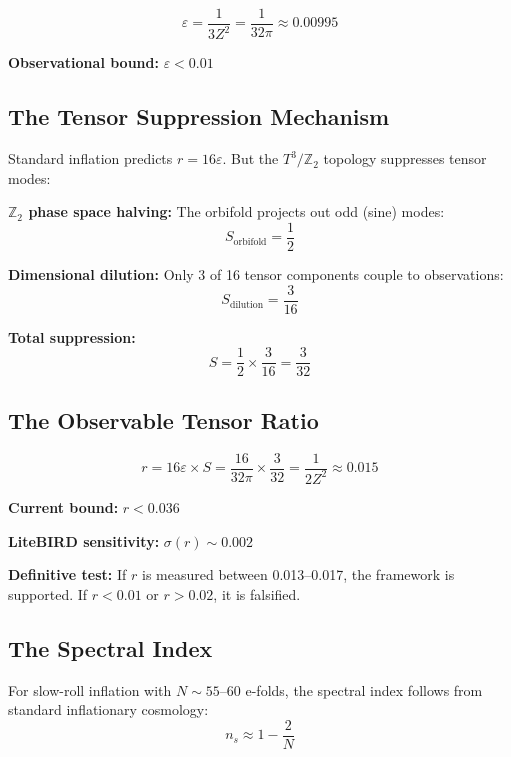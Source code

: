 \documentclass[12pt,a4paper]{article}
\newcommand{\Ztwo}{\mathbb{Z}_2}
\newcommand{\Tthree}{T^3}
\newcommand{\Zsq}{Z^2}
\begin{document}
\begin{equation}
\varepsilon = \frac{1}{3\Zsq} = \frac{1}{32\pi} \approx 0.00995
\end{equation}

\textbf{Observational bound:} $\varepsilon < 0.01$ \checkmark

\subsection{The Tensor Suppression Mechanism}

Standard inflation predicts $r = 16\varepsilon$. But the $\Tthree/\Ztwo$ topology suppresses tensor modes:

\textbf{$\Ztwo$ phase space halving:} The orbifold projects out odd (sine) modes:
\begin{equation}
S_{\text{orbifold}} = \frac{1}{2}
\end{equation}

\textbf{Dimensional dilution:} Only 3 of 16 tensor components couple to observations:
\begin{equation}
S_{\text{dilution}} = \frac{3}{16}
\end{equation}

\textbf{Total suppression:}
\begin{equation}
S = \frac{1}{2} \times \frac{3}{16} = \frac{3}{32}
\end{equation}

\subsection{The Observable Tensor Ratio}

\begin{equation}
\boxed{r = 16\varepsilon \times S = \frac{16}{32\pi} \times \frac{3}{32} = \frac{1}{2\Zsq} \approx 0.015}
\end{equation}

\textbf{Current bound:} $r < 0.036$ \checkmark

\textbf{LiteBIRD sensitivity:} $\sigma(r) \sim 0.002$

\textbf{Definitive test:} If $r$ is measured between 0.013--0.017, the framework is supported. If $r < 0.01$ or $r > 0.02$, it is falsified.

\subsection{The Spectral Index}

For slow-roll inflation with $N \sim 55$--60 e-folds, the spectral index follows from standard inflationary cosmology:
\begin{equation}
n_s \approx 1 - \frac{2}{N}
\end{equation}
\end{document}

